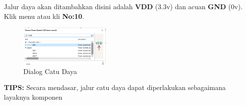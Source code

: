 \documentclass[12pt]{book}
\begin{document}
	Jalur daya akan ditambahkan disini adalah \textbf{VDD} (3.3v) dan acuan \textbf{GND} (0v).
	Klik menu  atau kli \textbf{No:10}.

	\begin{figure}[!ht]
		\centering
		\includegraphics[width=0.4\textwidth]{images/sch/sch_8}
		\caption{Dialog Catu Daya}
	\end{figure}

	\textbf{TIPS:} Secara mendasar, jalur catu daya dapat diperlakukan sebagaimana layaknya komponen
\end{document}
